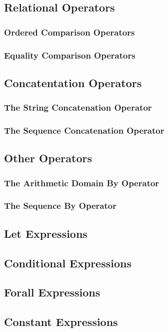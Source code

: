 \documentclass[10pt,twoside,titlepage]{article}
\begin{document}
\subsection{Relational Operators}
\subsubsection{Ordered Comparison Operators}
\subsubsection{Equality Comparison Operators}
\subsection{Concatentation Operators}
\subsubsection{The String Concatenation Operator}
\subsubsection{The Sequence Concatenation Operator}
\subsection{Other Operators}
\subsubsection{The Arithmetic Domain By Operator}
\subsubsection{The Sequence By Operator}
\subsection{Let Expressions}
\subsection{Conditional Expressions}
\subsection{Forall Expressions}
\subsection{Constant Expressions}
\end{document}
